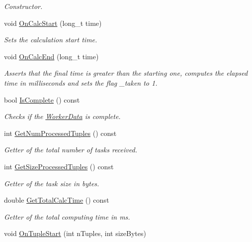 \begin{DoxyCompactItemize}
\begin{DoxyCompactList}\small\item\em Constructor. \end{DoxyCompactList}\item 
void \hyperlink{class_worker_data_a7cdf820edb4a35a187b44867338df081}{On\-Calc\-Start} (long\-\_\-t time)
\begin{DoxyCompactList}\small\item\em Sets the calculation start time. \end{DoxyCompactList}\item 
void \hyperlink{class_worker_data_affaf7d4d2752b5ab9403a5ce4261d822}{On\-Calc\-End} (long\-\_\-t time)
\begin{DoxyCompactList}\small\item\em Asserts that the final time is greater than the starting one, computes the elapsed time in milliseconds and sets the flag \-\_\-taken to 1. \end{DoxyCompactList}\item 
bool \hyperlink{class_worker_data_a716d46f32ef6985c8d2a826730af3c11}{Is\-Complete} () const 
\begin{DoxyCompactList}\small\item\em Checks if the \hyperlink{class_worker_data}{Worker\-Data} is complete. \end{DoxyCompactList}\item 
int \hyperlink{class_worker_data_a883ef301ef48a0c31ad8a2d36386bdfa}{Get\-Num\-Processed\-Tuples} () const 
\begin{DoxyCompactList}\small\item\em Getter of the total number of tasks received. \end{DoxyCompactList}\item 
int \hyperlink{class_worker_data_aba89b2bee47cb61a3811e7fd877108f4}{Get\-Size\-Processed\-Tuples} () const 
\begin{DoxyCompactList}\small\item\em Getter of the task size in bytes. \end{DoxyCompactList}\item 
double \hyperlink{class_worker_data_a793c237b9158128a0db751f49bbaa6fa}{Get\-Total\-Calc\-Time} () const 
\begin{DoxyCompactList}\small\item\em Getter of the total computing time in ms. \end{DoxyCompactList}\item 
void \hyperlink{class_worker_data_a40a184b4e5b1a9a57577daf10add3e62}{On\-Tuple\-Start} (int n\-Tuples, int size\-Bytes)

\end{DoxyCompactItemize}
